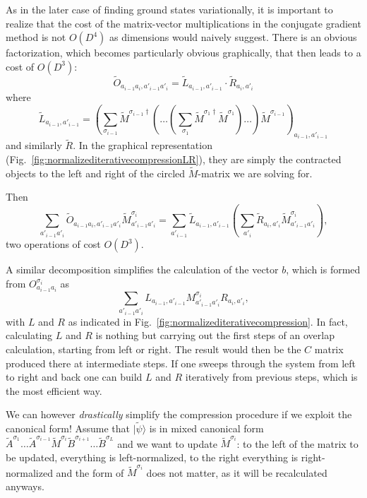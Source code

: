 \documentclass[a4paper,10pt,oneside,onecolumn,1p,times]{elsarticle}
\newcommand{\ket}[1]{\mbox{$| #1  \rangle$}}
\begin{document}
As in the later case of finding ground states variationally, it is important to realize that the cost of the matrix-vector multiplications in the conjugate gradient method is not $O(D^4)$ as dimensions would naively suggest. There is an obvious factorization, which becomes particularly obvious graphically, that then leads to a cost of $O(D^3)$:
\begin{equation}
\tilde{O}_{a_{i-1}a_i,a'_{i-1}a'_i} = \tilde{L}_{a_{i-1},a'_{i-1}} \cdot \tilde{R}_{a_{i},a'_{i}}
\end{equation}
where 
\begin{equation}
\tilde{L}_{a_{i-1},a'_{i-1}} = \left( \sum_{\sigma_{i-1}}  \tilde{M}^{\sigma_{i-1}\dagger} \left( \ldots \left( \sum_{\sigma_1}  
\tilde{M}^{\sigma_{1}\dagger} \tilde{M}^{\sigma_{1}} \right) \ldots \right) \tilde{M}^{\sigma_{i-1}} \right)_{a_{i-1},a'_{i-1}}
\end{equation}
and similarly $\tilde{R}$. In the graphical representation (Fig.~\ref{fig:normalizediterativecompressionLR}), they are simply the contracted objects to the left and right of the circled $\tilde{M}$-matrix we are solving for.

Then 
\begin{equation}
\sum_{a'_{i-1}a'_i} \tilde{O}_{a_{i-1}a_i,a'_{i-1}a'_i} \tilde{M}^{\sigma_i}_{a'_{i-1}a'_i} =
\sum_{a'_{i-1}} \tilde{L}_{a_{i-1},a'_{i-1}} \left( \sum_{a'_i} \tilde{R}_{a_{i},a'_{i}}
 \tilde{M}^{\sigma_i}_{a'_{i-1}a'_i} \right),
\end{equation}
two operations of cost $O(D^3)$.

A similar decomposition simplifies the calculation of the vector $b$, which is formed from $O^{\sigma_i}_{a_{i-1}a_i}$ as
\begin{equation}
\sum_{a'_{i-1}a'_i} L_{a_{i-1},a'_{i-1}} M^{\sigma_i}_{a'_{i-1}a'_i} R_{a_{i},a'_{i}} , 
\end{equation}
with $L$ and $R$ as indicated in Fig.~\ref{fig:normalizediterativecompression}.
In fact, calculating $L$ and $R$ is nothing but carrying out the first steps of an overlap calculation, starting from left or right. The result would then be the $C$ matrix produced there at intermediate steps. If one sweeps through the system from left to right and back one can build $L$ and $R$ iteratively from previous steps, which is the most efficient way. 

We can however {\em drastically} simplify the compression procedure if we exploit the canonical form! Assume that $\ket{\tilde{\psi}}$ is in mixed canonical form $\tilde{A}^{\sigma_1} \ldots \tilde{A}^{\sigma_{i-1}} \tilde{M}^{\sigma_i} \tilde{B}^{\sigma_{i+1}}  \ldots \tilde{B}^{\sigma_L}$ and we want to update $\tilde{M}^{\sigma_i}$: to the left of the matrix to be updated, everything is left-normalized, to the right everything is right-normalized and the form of $\tilde{M}^{\sigma_i}$ does not matter, as it will be recalculated anyways. 
\end{document}
